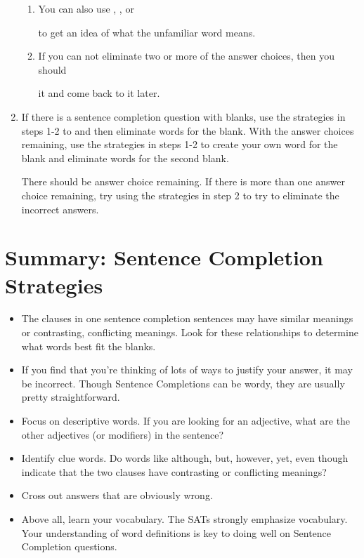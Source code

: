 \documentclass[12pt]{book}
\newcommand{\longline}{\underline{\hspace{2in}} }
\begin{document}
\begin{enumerate}
\begin{enumerate}[label=(\Alph*)]
\item You can also use \longline, \longline, or

\longline to get an idea of what the unfamiliar word means.

\item If you can not eliminate two or more of the answer choices, then you should

\longline it and come back to it later.
\end{enumerate}

\item{If there is a sentence completion question with \longline blanks, use the strategies in steps 1-2 to \longline and then eliminate words for the \longline blank. With the answer choices remaining, use the strategies in steps 1-2 to create your own word for the blank and  \longline eliminate words for the second blank.}

\bigskip
There should be \longline answer choice remaining. If there is more than one answer choice remaining, try using the strategies in step 2 to try to eliminate the incorrect answers. 
\end{enumerate}
\pagebreak

\section[Strategies]{Summary: Sentence Completion Strategies}

\begin{itemize}
\item The clauses in one sentence completion sentences may have similar meanings or contrasting, conflicting meanings.  Look for these relationships to determine what words best fit the blanks.
\vfill\item If you find that you're thinking of lots of ways to justify your answer, it may be incorrect.  Though Sentence Completions can be wordy, they are usually pretty straightforward.
\vfill\item Focus on descriptive words.  If you are looking for an adjective, what are the other adjectives (or modifiers) in the sentence?
\vfill\item Identify clue words.  Do words like although, but, however, yet, even though indicate that the two clauses have contrasting or conflicting meanings?
\vfill\item Cross out answers that are obviously wrong.
\vfill\item Above all, learn your vocabulary.  The SATs strongly emphasize vocabulary.  Your understanding of word definitions is key to doing well on Sentence Completion questions.
\end{itemize}
\end{document}
